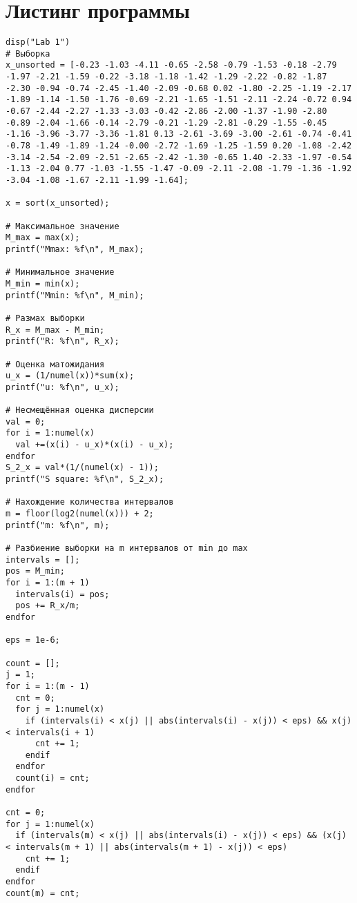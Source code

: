 \section{Листинг программы}
\begin{lstlisting}
disp("Lab 1")
# Выборка
x_unsorted = [-0.23 -1.03 -4.11 -0.65 -2.58 -0.79 -1.53 -0.18 -2.79 -1.97 -2.21 -1.59 -0.22 -3.18 -1.18 -1.42 -1.29 -2.22 -0.82 -1.87 -2.30 -0.94 -0.74 -2.45 -1.40 -2.09 -0.68 0.02 -1.80 -2.25 -1.19 -2.17 -1.89 -1.14 -1.50 -1.76 -0.69 -2.21 -1.65 -1.51 -2.11 -2.24 -0.72 0.94 -0.67 -2.44 -2.27 -1.33 -3.03 -0.42 -2.86 -2.00 -1.37 -1.90 -2.80 -0.89 -2.04 -1.66 -0.14 -2.79 -0.21 -1.29 -2.81 -0.29 -1.55 -0.45 -1.16 -3.96 -3.77 -3.36 -1.81 0.13 -2.61 -3.69 -3.00 -2.61 -0.74 -0.41 -0.78 -1.49 -1.89 -1.24 -0.00 -2.72 -1.69 -1.25 -1.59 0.20 -1.08 -2.42 -3.14 -2.54 -2.09 -2.51 -2.65 -2.42 -1.30 -0.65 1.40 -2.33 -1.97 -0.54 -1.13 -2.04 0.77 -1.03 -1.55 -1.47 -0.09 -2.11 -2.08 -1.79 -1.36 -1.92 -3.04 -1.08 -1.67 -2.11 -1.99 -1.64];

x = sort(x_unsorted);

# Максимальное значение
M_max = max(x);
printf("Mmax: %f\n", M_max);

# Минимальное значение
M_min = min(x);
printf("Mmin: %f\n", M_min);

# Размах выборки
R_x = M_max - M_min;
printf("R: %f\n", R_x);

# Оценка матожидания
u_x = (1/numel(x))*sum(x);
printf("u: %f\n", u_x);

# Несмещённая оценка дисперсии
val = 0;
for i = 1:numel(x)
  val +=(x(i) - u_x)*(x(i) - u_x);
endfor
S_2_x = val*(1/(numel(x) - 1));
printf("S square: %f\n", S_2_x);

# Нахождение количества интервалов
m = floor(log2(numel(x))) + 2;
printf("m: %f\n", m);

# Разбиение выборки на m интервалов от min до max
intervals = [];
pos = M_min;
for i = 1:(m + 1)
  intervals(i) = pos;
  pos += R_x/m;
endfor

eps = 1e-6;

count = [];
j = 1;
for i = 1:(m - 1)
  cnt = 0;
  for j = 1:numel(x)
    if (intervals(i) < x(j) || abs(intervals(i) - x(j)) < eps) && x(j) < intervals(i + 1)
      cnt += 1;
    endif
  endfor
  count(i) = cnt;
endfor

cnt = 0;
for j = 1:numel(x)
  if (intervals(m) < x(j) || abs(intervals(i) - x(j)) < eps) && (x(j) < intervals(m + 1) || abs(intervals(m + 1) - x(j)) < eps)
    cnt += 1;
  endif
endfor
count(m) = cnt;


\end{lstlisting}
